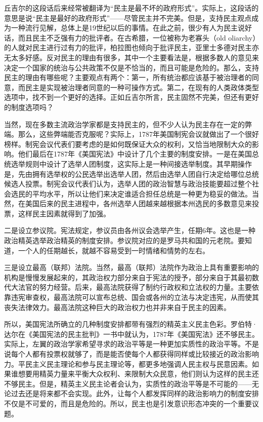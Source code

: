 丘吉尔的这段话后来经常被翻译为“民主是最不坏的政府形式”。实际上，这段话的意思是说“民主是最好的政府形式”——尽管民主并不完美。但是，支持民主观点成为一种流行见解，总体上是19世纪以后的事情。在此之前，很少有人为民主说好话，而且民主不乏强有力的批评者。在古希腊，一位被称为老寡头（old oliarchy）的人就对民主进行过有力的批评，柏拉图也倾向于批评民主，亚里士多德对民主亦无太多好感。反对民主的理由有很多，其中一个主要看法是，根据多数人的意见来决定一个国家的统治与公共政策不仅是不恰当的，而且可能是危险的。那么，支持民主的理由有哪些呢？主要观点有两个：第一，所有统治都应该基于被治理者的同意，而民主是实现被治理者同意的一种可操作方式。第二，在现有的人类政体类型选项中，找不到一个更好的选择。正如丘吉尔所言，民主固然不完美，但还有更好的制度选项吗？

当然，现在多数主流政治学家都是支持民主的，但不少人认为民主存在一定的弊端。那么，这些弊端能否克服呢？实际上，1787年美国制宪会议就做出了一个很好榜样。制宪会议代表们要考虑的是如何既保证大众的权利，又恰当地限制大众的影响。他们最后在1787年《美国宪法》中设计了几个主要的制度安排。一是在美国总统选举规则中设计了选举人团制度，这实际上是一种间接选举制度。其早期操作是，先由拥有选举权的公民选举出选举人团，然后由选举人团自行决定给哪位总统候选人投票。制宪会议代表们认为，选举人团的政治智慧与政治技能要超过整个社会选民的平均水平，所以让他们来决定谁适合担任总统是一种更为稳妥的做法。当然，在美国后来的民主进程中，各州选举人团越来越根据本州选民的多数意见来投票，这样民主因素就得到了加强。

二是设立参议院。宪法规定，参议员由各州议会选举产生，任期6年。这也是一种政治精英选举政治精英的制度安排。参议院对应的是罗马共和国的元老院。要知道，一个人的任期越长，就越不容易受到一时情绪和情势的左右。

三是设立最高（联邦）法院。当然，最高（联邦）法院作为政治上具有重要影响的机构是慢慢发展起来的，其政治权力部分来自于宪法的授予，部分来自于其最初数代大法官的努力经营。后来，最高法院获得了制约行政权和立法权的力量。主要依靠违宪审查权，最高法院可以宣布总统、国会或各州的立法与决定违宪，从而使其丧失法律效力。最高法院这种巨大的政治权力也并非来自于民主的因素。

所以，美国宪法所确立的几种制度安排都带有强烈的精英主义民主色彩。罗伯特·达尔在《美国宪法的民主批判》一书中就认为，1787年《美国宪法》还不够民主。实际上，左翼的政治学家希望寻求的政治平等是一种更加实质性的政治平等。不是说每个人都有投票权就够了，而是能否使每个人都获得同样或比较接近的政治影响力。平民主义民主理论和参与民主理论等，都更多地强调人民主权与民意因素。如果谁想要用精英力量来平衡大众权利、来限制大众民意，他们则认为这样的民主还不够民主。但是，精英主义民主论者会认为，实质性的政治平等是不可能的——无论过去还是将来都不会实现。此外，让每个人都发挥同样的政治影响力的制度安排不仅是不可爱的，而且是危险的。所以，民主也是引发意识形态冲突的一个重要议题。


